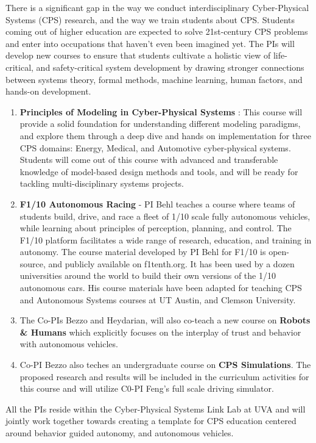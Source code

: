 There is a significant gap in the way we conduct interdisciplinary Cyber-Physical Systems (CPS) research, and the way we train students about CPS. Students coming out of higher education are expected to solve 21st-century CPS problems and enter into occupations that haven’t even been imagined yet. 
The PIs will develop new courses to ensure that students cultivate a holistic view of life-critical, and safety-critical system development by drawing stronger connections between systems theory, formal methods, machine learning, human factors, and hands-on development.
\begin{enumerate}[itemsep=0pt,parsep=0pt,topsep=4pt,leftmargin=0.4in]
    \item \textbf{Principles of Modeling in Cyber-Physical Systems} : This course will provide a solid foundation for understanding different modeling paradigms, and explore them through a deep dive and hands on implementation for three CPS domains: Energy, Medical, and Automotive cyber-physical systems. Students will come out of this course with advanced and transferable knowledge of model-based design methods and tools, and will be ready for tackling multi-disciplinary systems projects. 
    \item \textbf{F1/10 Autonomous Racing} - PI Behl teaches a course where teams of students build, drive, and race a fleet of 1/10 scale fully autonomous vehicles, while learning about principles of perception, planning, and control. The F1/10 platform facilitates a wide range of research, education, and training in autonomy. The course material developed by PI Behl for F1/10 is open-source, and publicly available on f1tenth.org. It has been used by a dozen universities around the world to build their own versions of the 1/10 autonomous cars. His course materials have been adapted for teaching CPS and Autonomous Systems courses at UT Austin, and Clemson University.
    \item The Co-PIs Bezzo and Heydarian, will also co-teach a new course on \textbf{Robots \& Humans} which explicitly focuses on the interplay of trust and behavior with autonomous vehicles.
    \item Co-PI Bezzo also teches an undergraduate course on \textbf{CPS Simulations}. The proposed research and results will be included in the curriculum activities for this course and will utilize C0-PI Feng's full scale driving simulator.
\end{enumerate}
All the PIs reside within the Cyber-Physical Systems Link Lab at UVA and will jointly work together towards creating a template for CPS education centered around behavior guided autonomy, and autonomous vehicles. 

